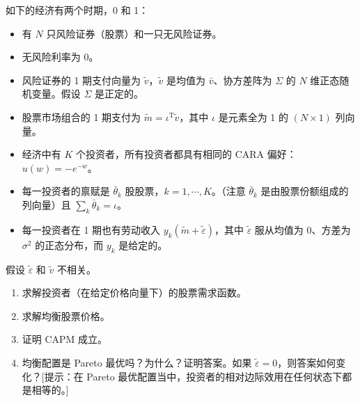 
\par\noindent\begin{minipage}{\linewidth}
\begin{problem}
 如下的经济有两个时期，0 和 1：
\begin{itemize}
    \item 有 $N$ 只风险证券（股票）和一只无风险证券。
    \item 无风险利率为 0。
    \item 风险证券的 1 期支付向量为 $\tilde{v}$，$\tilde{v}$ 是均值为 $\bar{v}$、协方差阵为 $\Sigma$ 的 $N$ 维正态随机变量。假设 $\Sigma$ 是正定的。
    \item 股票市场组合的 1 期支付为 $\tilde{m}=\iota^{\mathrm{T}}\tilde{v}$，其中 $\iota$ 是元素全为 1 的 $(N\times 1)$ 列向量。
    \item 经济中有 $K$ 个投资者，所有投资者都具有相同的 CARA 偏好：$u(w)=-e^{-w}$。
    \item 每一投资者的禀赋是 $\bar{\theta}_{k}$ 股股票，$k=1,\cdots,K$。（注意 $\bar{\theta}_{k}$ 是由股票份额组成的列向量）且 $\sum_{k}\bar{\theta}_{k}=\iota$。
    \item 每一投资者在 1 期也有劳动收入 $y_{k}(\tilde{m}+\tilde{\varepsilon})$，其中 $\tilde{\varepsilon}$ 服从均值为 0、方差为 $\sigma^{2}$ 的正态分布，而 $y_{k}$ 是给定的。
\end{itemize}
假设 $\tilde{\varepsilon}$ 和 $\tilde{v}$ 不相关。
\begin{enumerate}[label=(\alph*)]
    \item 求解投资者（在给定价格向量下）的股票需求函数。
    \item 求解均衡股票价格。
    \item 证明 CAPM 成立。
    \item 均衡配置是 Pareto 最优吗？为什么？证明答案。如果 $\tilde{\varepsilon}=0$，则答案如何变化？[提示：在 Pareto 最优配置当中，投资者的相对边际效用在任何状态下都是相等的。]
\end{enumerate}
\end{problem}
\end{minipage}\par
